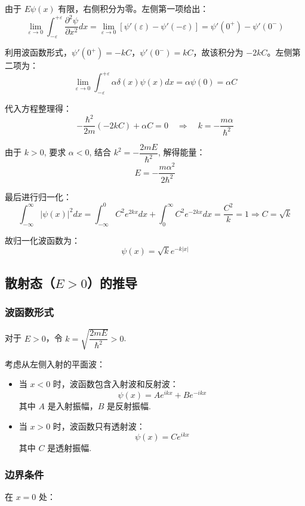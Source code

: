 由于 $E \psi(x)$ 有限，右侧积分为零。左侧第一项给出：
\[
\lim_{\varepsilon \to 0} \int_{-\varepsilon}^{+\varepsilon} \frac{\partial^2 \psi}{\partial x^2} dx = \lim_{\varepsilon \to 0} \left[ \psi'(\varepsilon) - \psi'(-\varepsilon) \right] = \psi'(0^+) - \psi'(0^-)
\]

利用波函数形式，$\psi'(0^+) = -kC$，$\psi'(0^-) = kC$，故该积分为 $-2kC$。左侧第二项为：
\[
\lim_{\varepsilon \to 0} \int_{-\varepsilon}^{+\varepsilon} \alpha \delta(x) \psi(x) dx = \alpha \psi(0) = \alpha C
\]

代入方程整理得：
\[
-\frac{\hbar^2}{2m} (-2kC) + \alpha C = 0 \quad \Rightarrow \quad k =- \frac{m\alpha}{\hbar^2}
\]

由于 $k>0$, 要求 $\alpha<0$, 结合 $k^2 = -\dfrac{2mE}{\hbar^2}$, 解得能量：
\[
E = -\frac{m\alpha^2}{2\hbar^2}
\]

最后进行归一化：
\[
\int_{-\infty}^{\infty} |\psi(x)|^2 dx = \int_{-\infty}^{0} C^2 e^{2kx} dx + \int_{0}^{\infty} C^2 e^{-2kx} dx = \frac{C^2}{k} = 1  \Rightarrow C = \sqrt k 
\]

故归一化波函数为：
\[\psi \left( x \right) = \sqrt k {e^{-k\left| x \right|}}\]

\subsection{散射态（$E>0$）的推导}

\subsubsection{波函数形式}

对于 \(E>0\)，令 \(k = \sqrt{\dfrac{2mE}{\hbar^2}} > 0\).

考虑从左侧入射的平面波：

\begin{itemize}
	\item 当 \(x<0\) 时，波函数包含入射波和反射波：
	\[
	\psi(x) = A e^{ikx} + B e^{-ikx}
	\]
	其中 \(A\) 是入射振幅，\(B\) 是反射振幅.
	
	\item 当 \(x>0\) 时，波函数只有透射波：
	\[
	\psi(x) = C e^{ikx}
	\]
	其中 \(C\) 是透射振幅.
\end{itemize}

\subsubsection{边界条件}

在 \(x=0\) 处：

